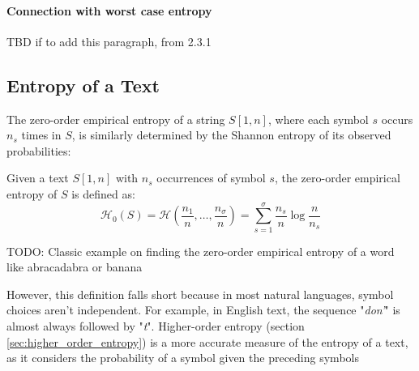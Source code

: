 \paragraph{Connection with worst case entropy}
TBD if to add this paragraph, from \cite{navarro2016compact} 2.3.1

\subsection{Entropy of a Text}
The zero-order empirical entropy of a string $S[1, n]$, where each symbol $s$ occurs $n_s$ times in $S$, is similarly determined by the Shannon entropy of its observed probabilities:
\begin{definition}
    Given a text $S[1, n]$ with $n_s$ occurrences of symbol $s$, the zero-order empirical entropy of $S$ is defined as:
    \begin{equation}
        \mathcal{H}_0(S) = \mathcal{H} \left( \frac{n_1}{n} , \ldots, \frac{n_{\sigma}}{n} \right) =  \sum_{s=1}^{\sigma} \frac{n_s}{n} \log \frac{n}{n_s}
    \end{equation}
\end{definition}
\begin{example}
    TODO: Classic example on finding the zero-order empirical entropy of a word like abracadabra or banana
\end{example}
However, this definition falls short because in most natural languages, symbol choices aren't independent. For example, in English text, the sequence "\emph{don'}" is almost always followed by "\emph{t}". Higher-order entropy (section \ref{sec:higher_order_entropy}) is a more accurate measure of the entropy of a text, as it considers the probability of a symbol given the preceding symbols
